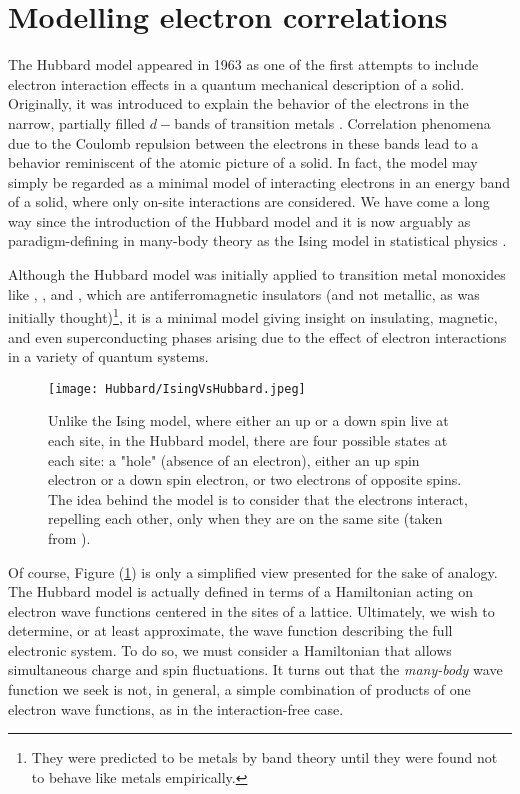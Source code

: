 \section{Modelling electron correlations}\label{sec:intro}

The Hubbard model appeared in 1963 as one of the first attempts to include electron interaction effects in a quantum mechanical description of a solid.
Originally, it was introduced to explain the behavior of the electrons in the narrow, partially filled $d-$bands of transition metals \cite{hubbard_electron_1963}.
Correlation phenomena due to the Coulomb repulsion between the electrons in these bands lead to a behavior reminiscent of the atomic picture of a solid.
In fact, the model may simply be regarded as a minimal model of interacting electrons in an energy band of a solid, where only on-site interactions are considered.
We have come a long way since the introduction of the Hubbard model and it is now arguably as paradigm-defining in many-body theory as the Ising model in statistical physics \cite{fazekas_lecture_1999, mahan_many-particle_2000, altland_condensed_2010}.

Although the Hubbard model was initially applied to transition metal monoxides like , , and , which are antiferromagnetic insulators (and not metallic, as was initially thought)\footnote{They were predicted to be metals by band theory until they were found not to behave like metals empirically.}, it is a minimal model giving insight on insulating, magnetic, and even superconducting phases arising due to the effect of electron interactions in a variety of quantum systems.

\begin{figure}[H]
	\centering
\texttt{[image: Hubbard/IsingVsHubbard.jpeg]}
	\caption[Graphical comparison between the Ising and the Hubbard models.]{Unlike the Ising model, where either an up or a down spin live at each site, in the Hubbard model, there are four possible states at each site: a "hole" (absence of an electron), either an up spin electron or a down spin electron, or two electrons of opposite spins.
	The idea behind the model is to consider that the electrons interact, repelling each other, only when they are on the same site (taken from \cite{hayes_hip-hop_2009}).}
	\label{fig:IsingVsHubbard}
\end{figure}

Of course, Figure (\ref{fig:IsingVsHubbard}) is only a simplified view presented for the sake of analogy.
The Hubbard model is actually defined in terms of a Hamiltonian acting on electron wave functions centered in the sites of a lattice.
Ultimately, we wish to determine, or at least approximate, the wave function describing the full electronic system.
To do so, we must consider a Hamiltonian that allows simultaneous charge and spin fluctuations.
It turns out that the \emph{many-body} wave function we seek is not, in general, a simple combination of products of one electron wave functions, as in the interaction-free case.

